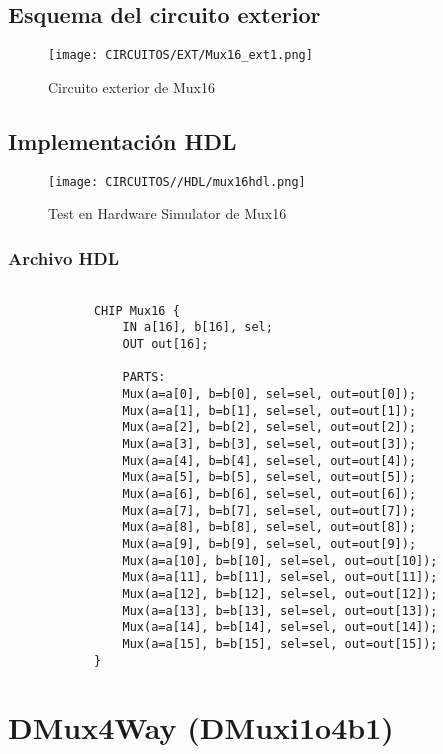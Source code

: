 \documentclass[12pt]{article}
\begin{document}
		\subsection{Esquema del circuito exterior}
		\begin{figure}[H]
			\centering
			\texttt{[image: CIRCUITOS/EXT/Mux16\_ext1.png]}
			\caption{Circuito exterior de Mux16 \cite{circuitverse}}
			\label{fig:mux16_ext}
		\end{figure}
		\subsection{Implementación HDL}
		\begin{figure}[H]
			\centering
			\texttt{[image: CIRCUITOS//HDL/mux16hdl.png]}
			\caption{Test en Hardware Simulator de Mux16 \cite{nand2tetris}}
			\label{fig:hdlmux16}
		\end{figure}
		\subsubsection{Archivo HDL}
		\begin{lstlisting}

			CHIP Mux16 {
				IN a[16], b[16], sel;
				OUT out[16];

				PARTS:
				Mux(a=a[0], b=b[0], sel=sel, out=out[0]);
				Mux(a=a[1], b=b[1], sel=sel, out=out[1]);
				Mux(a=a[2], b=b[2], sel=sel, out=out[2]);
				Mux(a=a[3], b=b[3], sel=sel, out=out[3]);
				Mux(a=a[4], b=b[4], sel=sel, out=out[4]);
				Mux(a=a[5], b=b[5], sel=sel, out=out[5]);
				Mux(a=a[6], b=b[6], sel=sel, out=out[6]);
				Mux(a=a[7], b=b[7], sel=sel, out=out[7]);
				Mux(a=a[8], b=b[8], sel=sel, out=out[8]);
				Mux(a=a[9], b=b[9], sel=sel, out=out[9]);
				Mux(a=a[10], b=b[10], sel=sel, out=out[10]);
				Mux(a=a[11], b=b[11], sel=sel, out=out[11]);
				Mux(a=a[12], b=b[12], sel=sel, out=out[12]);
				Mux(a=a[13], b=b[13], sel=sel, out=out[13]);
				Mux(a=a[14], b=b[14], sel=sel, out=out[14]);
				Mux(a=a[15], b=b[15], sel=sel, out=out[15]);
			}
		\end{lstlisting}
		\newpage


		\section{DMux4Way (DMuxi1o4b1)} \label{dmux4label}
\end{document}
